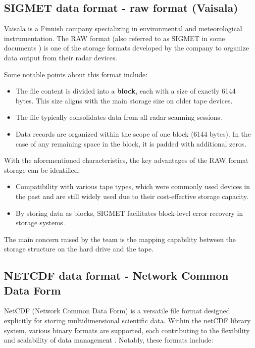 \subsection{SIGMET data format - raw format (Vaisala)}
\label{sigmet}
Vaisala is a Finnish company specializing in environmental and meteorological instrumentation. The RAW format (also referred to as SIGMET in some documents \cite{lrose_RadxConvert}) is one of the storage formats developed by the company to organize data output from their radar devices.

Some notable points about this format include:

\begin{itemize}
    \item The file content is divided into a \textbf{block}, each with a size of exactly 6144 bytes. This size aligns with the main storage size on older tape devices.
    \item The file typically consolidates data from all radar scanning sessions.
    \item Data records are organized within the scope of one block (6144 bytes). In the case of any remaining space in the block, it is padded with additional zeros.
\end{itemize}

With the aforementioned characteristics, the key advantages of the RAW format storage can be identified: \cite{raw_product_format_vaisala}

\begin{itemize}
    \item Compatibility with various tape types, which were commonly used devices in the past and are still widely used due to their cost-effective storage capacity.
    \item By storing data as blocks, SIGMET facilitates block-level error recovery in storage systems.
\end{itemize}

The main concern raised by the team is the mapping capability between the storage structure on the hard drive and the tape.

\subsection{NETCDF data format - Network Common Data Form}

NetCDF (Network Common Data Form) is a versatile file format designed explicitly for storing multidimensional scientific data. Within the netCDF library system, various binary formats are supported, each contributing to the flexibility and scalability of data management \cite{netcdf}. Notably, these formats include:

